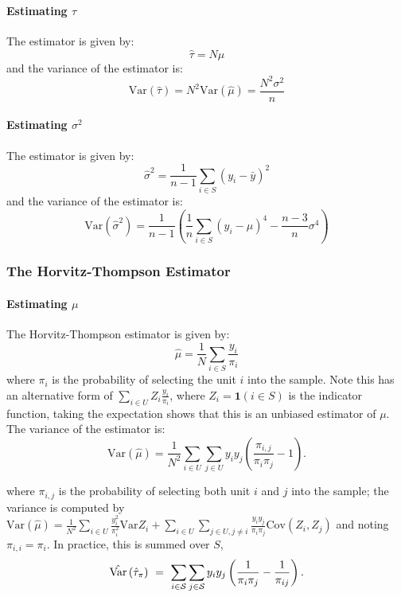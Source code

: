 \documentclass{article}
\begin{document}
\paragraph{Estimating $\tau$} The estimator is given by:
\begin{equation*}
    \hat{\tau} = N\hat{\mu}
\end{equation*}
and the variance of the estimator is:
\begin{equation*}
    \mathrm{Var}(\hat{\tau}) = N^2\mathrm{Var}(\hat{\mu}) = \frac{N^2\sigma^2}{n}
\end{equation*}

\paragraph{Estimating $\sigma^2$} The estimator is given by:
\begin{equation*}
    \hat{\sigma}^2 = \frac{1}{n-1}\sum_{i\in S} (y_i-\bar{y})^2
\end{equation*}
and the variance of the estimator is:
\begin{equation*}
    \mathrm{Var}(\hat{\sigma}^2) = \frac{1}{n-1}\left(\frac{1}{n}\sum_{i\in S} (y_i-\mu)^4 - \frac{n-3}{n}\sigma^4\right)
\end{equation*}


\subsubsection{The Horvitz-Thompson Estimator}
\paragraph{Estimating $\mu$} The Horvitz-Thompson estimator is given by:
\begin{equation*}
    \hat{\mu} = \frac{1}{N}\sum_{i\in S} \frac{y_i}{\pi_i}
\end{equation*}
where $\pi_i$ is the probability of selecting the unit $i$ into the sample. Note this has an alternative form of $\sum_{i\in U} Z_i\frac{y_i}{\pi_i}$, where $Z_i=\mathbf{1}(i\in S)$ is the indicator function, taking the expectation shows that this is an unbiased estimator of $\mu$.  The variance of the estimator is:
\begin{equation*}
    \mathrm{Var}(\hat{\mu}) = \frac{1}{N^2}\sum_{i\in U}\sum_{j\in U}y_{i}y_{j}\left({\frac{\pi_{i,j}}{\pi_{i}\pi_{j}}}-1\right).
\end{equation*}

where $\pi_{i,j}$ is the probability of selecting both unit $i$ and $j$ into the sample; the variance is computed by $\mathrm{Var}(\hat{\mu}) = \frac{1}{N^2} \sum_{i\in U}\frac{y_{i}^{2}}{\pi_{i}^{2}}\mathrm{Var}Z_{i}+\sum_{i\in U}\sum_{j\in U,j\neq i}\frac{y_{i}y_{j}}{\pi_{i}\pi_{j}}\mathrm{Cov}(Z_{i},Z_{j})$ and noting $\pi_{i,i}=\pi_{i}$. In practice, this is summed over $S$, 
\begin{equation*}
    \hat{\mathrm{Var}}\left(\hat{\tau}_{\pi}\right)~=~\sum_{i\in{\cal S}}\sum_{j\in{\cal S}}y_{i}y_{j}\left(\frac{1}{\pi_{i}\pi_{j}}-\frac{1}{\pi_{i j}}\right).
\end{equation*}
\end{document}
